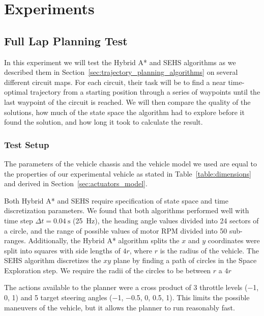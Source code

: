 \chapter{Experiments}
\label{chapter:experiments}


\section{Full Lap Planning Test}

In this experiment we will test the Hybrid A* and \gls{SEHS} algorithms as we described them in Section~\ref{sec:trajectory_planning_algorithms} on several different circuit maps. For each circuit, their task will be to find a near time-optimal trajectory from a starting position through a series of waypoints until the last waypoint of the circuit is reached. We will then compare the quality of the solutions, how much of the state space the algorithm had to explore before it found the solution, and how long it took to calculate the result.

\subsection{Test Setup}

The parameters of the vehicle chassis and the vehicle model we used are equal to the properties of our experimental vehicle as stated in Table~\ref{table:dimensions} and derived in Section~\ref{sec:actuators_model}.

Both Hybrid A* and \gls*{SEHS} require specification of state space and time discretization parameters. We found that both algorithms performed well with time step $\Delta t=\SI{0.04}{\second}$ (\SI{25}{\hertz}), the heading angle values divided into \num{24} sectors of a circle, and the range of possible values of motor \gls*{RPM} divided into \num{50} sub-ranges. Additionally, the Hybrid A* algorithm splits the $x$ and $y$ coordinates were split into squares with side lengths of $4r$, where $r$ is the radius of the vehicle. The SEHS algorithm discretizes the $xy$ plane by finding a path of circles in the Space Exploration step. We require the radii of the circles to be between $r$ a $4r$

The actions available to the planner were a cross product of 3 throttle levels (\num{-1}, \num{0}, \num{1}) and 5 target steering angles (\num{-1}, \num{-0.5}, \num{0}, \num{0.5}, \num{1}). This limits the possible maneuvers of the vehicle, but it allows the planner to run reasonably fast.

